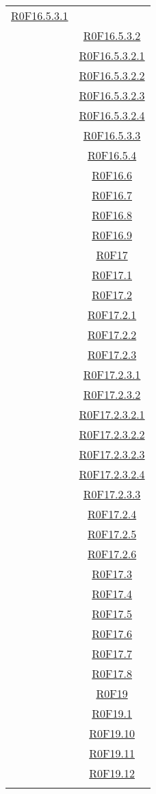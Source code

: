 \documentclass[../AnalisiDeiRequisiti.tex]{subfiles}
\begin{document}
\begin{longtable}{|c|c|}
\hyperlink{R0F16.5.3.1}{R0F16.5.3.1}\\& \hyperlink{R0F16.5.3.2}{R0F16.5.3.2}\\& \hyperlink{R0F16.5.3.2.1}{R0F16.5.3.2.1}\\& \hyperlink{R0F16.5.3.2.2}{R0F16.5.3.2.2}\\& \hyperlink{R0F16.5.3.2.3}{R0F16.5.3.2.3}\\& \hyperlink{R0F16.5.3.2.4}{R0F16.5.3.2.4}\\& \hyperlink{R0F16.5.3.3}{R0F16.5.3.3}\\& \hyperlink{R0F16.5.4}{R0F16.5.4}\\& \hyperlink{R0F16.6}{R0F16.6}\\& \hyperlink{R0F16.7}{R0F16.7}\\& \hyperlink{R0F16.8}{R0F16.8}\\& \hyperlink{R0F16.9}{R0F16.9}\\& \hyperlink{R0F17}{R0F17}\\& \hyperlink{R0F17.1}{R0F17.1}\\& \hyperlink{R0F17.2}{R0F17.2}\\& \hyperlink{R0F17.2.1}{R0F17.2.1}\\& \hyperlink{R0F17.2.2}{R0F17.2.2}\\& \hyperlink{R0F17.2.3}{R0F17.2.3}\\& \hyperlink{R0F17.2.3.1}{R0F17.2.3.1}\\& \hyperlink{R0F17.2.3.2}{R0F17.2.3.2}\\& \hyperlink{R0F17.2.3.2.1}{R0F17.2.3.2.1}\\& \hyperlink{R0F17.2.3.2.2}{R0F17.2.3.2.2}\\& \hyperlink{R0F17.2.3.2.3}{R0F17.2.3.2.3}\\& \hyperlink{R0F17.2.3.2.4}{R0F17.2.3.2.4}\\& \hyperlink{R0F17.2.3.3}{R0F17.2.3.3}\\& \hyperlink{R0F17.2.4}{R0F17.2.4}\\& \hyperlink{R0F17.2.5}{R0F17.2.5}\\& \hyperlink{R0F17.2.6}{R0F17.2.6}\\& \hyperlink{R0F17.3}{R0F17.3}\\& \hyperlink{R0F17.4}{R0F17.4}\\& \hyperlink{R0F17.5}{R0F17.5}\\& \hyperlink{R0F17.6}{R0F17.6}\\& \hyperlink{R0F17.7}{R0F17.7}\\& \hyperlink{R0F17.8}{R0F17.8}\\& \hyperlink{R0F19}{R0F19}\\& \hyperlink{R0F19.1}{R0F19.1}\\& \hyperlink{R0F19.10}{R0F19.10}\\& \hyperlink{R0F19.11}{R0F19.11}\\& \hyperlink{R0F19.12}{R0F19.12}\\& 
\end{longtable}
\end{document}
